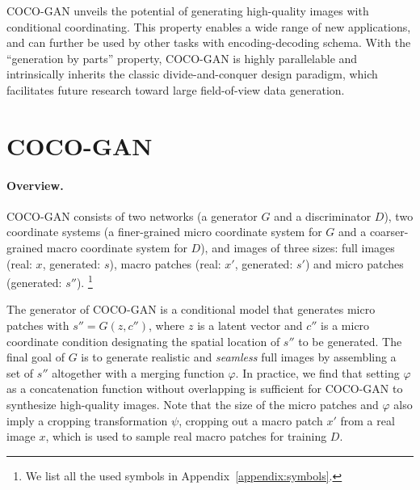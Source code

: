 \documentclass{article}
\newcommand{\modelName}{COCO-GAN }
\newcommand\blfootnote[1]{\begingroup
  \renewcommand\thefootnote{}\footnote{#1}\addtocounter{footnote}{-1}\endgroup
}
\begin{document}
    \modelName unveils the potential of generating high-quality images with conditional coordinating. This property enables a wide range of new applications, and can further be used by other tasks with encoding-decoding schema. With the ``generation by parts'' property, \modelName is highly parallelable and intrinsically inherits the classic divide-and-conquer design paradigm, which facilitates future research toward large field-of-view data generation.
    
    











































 





\section{\modelName}

    \paragraph{Overview.} \modelName consists of two networks (a generator $G$ and a discriminator $D$), two coordinate systems (a finer-grained micro coordinate system for $G$ and a coarser-grained macro coordinate system for $D$), and images of three sizes: full images (real: $x$, generated: $s$), macro patches (real: $x'$, generated: $s'$) and micro patches (generated: $s''$). \blfootnote{We list all the used symbols in Appendix~\ref{appendix:symbols}.}
    
    The generator of \modelName is a conditional model that generates micro patches with $s'' = G(z, c'')$, where $z$ is a latent vector and $c''$ is a micro coordinate condition designating the spatial location of $s''$ to be generated. The final goal of $G$ is to generate realistic and \textit{seamless} full images by assembling a set of $s''$ altogether with a merging function $\varphi$. In practice, we find that setting $\varphi$ as a concatenation function without overlapping is sufficient for \modelName to synthesize high-quality images. Note that the size of the micro patches and $\varphi$ also imply a cropping transformation $\psi$, cropping out a macro patch $x'$ from a real image $x$, which is used to sample real macro patches for training $D$.
    
\end{document}
